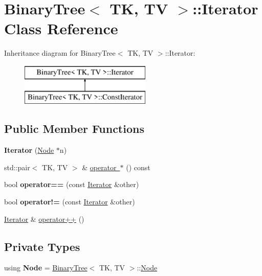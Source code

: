 \hypertarget{classBinaryTree_1_1Iterator}{}\section{Binary\+Tree$<$ TK, TV $>$\+::Iterator Class Reference}
\label{classBinaryTree_1_1Iterator}
Inheritance diagram for Binary\+Tree$<$ TK, TV $>$\+::Iterator\+:\begin{figure}[H]
\begin{center}
\leavevmode
\includegraphics[height=2.000000cm]{classBinaryTree_1_1Iterator}
\end{center}
\end{figure}
\subsection*{Public Member Functions}
\begin{DoxyCompactItemize}
\item 
\mbox{\label{classBinaryTree_1_1Iterator_af796ad5392a36091e37b0fe4b8f40505}} 
{\bfseries Iterator} (\mbox{\hyperlink{structBinaryTree_1_1Node}{Node}} $\ast$n)
\item 
std\+::pair$<$ TK, TV $>$ \& \mbox{\hyperlink{classBinaryTree_1_1Iterator_a60fc231c2695c4d6095ea4c384b218b0}{operator $\ast$}} () const
\item 
\mbox{\label{classBinaryTree_1_1Iterator_af8245bf973da4f92d3a1724a53f81a0c}} 
bool {\bfseries operator==} (const \mbox{\hyperlink{classBinaryTree_1_1Iterator}{Iterator}} \&other)
\item 
\mbox{\label{classBinaryTree_1_1Iterator_ad7300ecf4f91798027d898100e8c9799}} 
bool {\bfseries operator!=} (const \mbox{\hyperlink{classBinaryTree_1_1Iterator}{Iterator}} \&other)
\item 
\mbox{\hyperlink{classBinaryTree_1_1Iterator}{Iterator}} \& \mbox{\hyperlink{classBinaryTree_1_1Iterator_a6757f54b0ba8eda2f3040ba6b0facfdb}{operator++}} ()
\end{DoxyCompactItemize}
\subsection*{Private Types}
\begin{DoxyCompactItemize}
\item 
\mbox{\label{classBinaryTree_1_1Iterator_a1abe2b3caf1b77defcf66038f516ceda}} 
using {\bfseries Node} = \mbox{\hyperlink{classBinaryTree}{Binary\+Tree}}$<$ TK, TV $>$\+::\mbox{\hyperlink{structBinaryTree_1_1Node}{Node}}
\end{DoxyCompactItemize}
